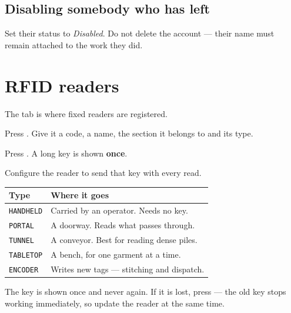 \subsection{Disabling somebody who has left}

Set their status to \emph{Disabled}. Do not delete the account --- their name must
remain attached to the work they did.

\section{RFID readers}

The  tab is where fixed readers are registered.


\begin{steps}
  \item Press . Give it a code, a name, the section it belongs
        to and its type.
  \item Press . A long key is shown \textbf{once}.
  \item Configure the reader to send that key with every read.
\end{steps}

\begin{table}[H]
\centering
\small
\begin{tabular}{@{}p{28mm}p{110mm}@{}}
\toprule
\textbf{Type} & \textbf{Where it goes} \\
\midrule
\texttt{HANDHELD} & Carried by an operator. Needs no key. \\
\texttt{PORTAL}   & A doorway. Reads what passes through. \\
\texttt{TUNNEL}   & A conveyor. Best for reading dense piles. \\
\texttt{TABLETOP} & A bench, for one garment at a time. \\
\texttt{ENCODER}  & Writes new tags --- stitching and dispatch. \\
\bottomrule
\end{tabular}
\end{table}

\begin{warnbox}
The key is shown once and never again. If it is lost, press  ---
the old key stops working immediately, so update the reader at the same time.
\end{warnbox}

